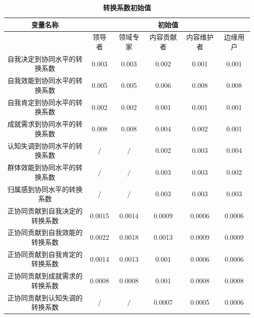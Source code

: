 \begin{table}[!htb]
  \centering
\caption{\small{\textbf{转换系数初始值}}}
\small
\begin{tabular}{|c|c|c|c|c|c|}
\hline
\multicolumn{ 1}{|c|}{变量名称} &                                     \multicolumn{ 5}{|c|}{初始值} \\
\hline
\multicolumn{ 1}{|c|}{} &        领导者 &       领域专家 &      内容贡献者 &      内容维护者 &       边缘用户 \\
\hline
自我决定到协同水平的转换系数 &     0.003       &     0.003       &      0.002      &      0.001      &     0.001       \\
\hline
自我效能到协同水平的转换系数 &      0.005      &    0.005        &      0.006      &      0.008      &        0.008    \\
\hline
自我肯定到协同水平的转换系数 &      0.002     &       0.002    &      0.001      &     0.001       &       0.001     \\
\hline
成就需求到协同水平的转换系数 &     0.008       &     0.008       &     0.004       &         0.002   &       0.001     \\
\hline
认知失调到协同水平的转换系数 &      $\slash$       &    $\slash$         &    0.002        &         0.003   &      0.004      \\
\hline
群体效能到协同水平的转换系数 &          $\slash$    &       $\slash$       &   0.003         &    0.003        &        0.002    \\
\hline
归属感到协同水平的转换系数 &        $\slash$      &      $\slash$        &      0.003      &     0.003       &   0.003         \\
\hline
正协同贡献到自我决定的转换系数 &    0.0015        &    0.0014        &      0.0009      &        0.0006    &      0.0006      \\
\hline
正协同贡献到自我效能的转换系数 &    0.0022        &      0.0018      &       0.0013     &       0.0009     &  0.0009          \\
\hline
正协同贡献到自我肯定的转换系数 &     0.0014       &        0.0013    &     0.001       &        0.0006    &     0.0006       \\
\hline
正协同贡献到成就需求的转换系数 &       0.0008     &        0.0008    &      0.001      &       0.0008     &       0.0008     \\
\hline
正协同贡献到认知失调的转换系数 &     $\slash$        &     $\slash$        &    0.0007        &     0.0005       &       0.0006     \\

\end{tabular}
\end{table}
